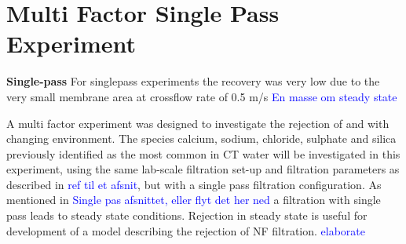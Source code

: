 \section{Multi Factor Single Pass Experiment}


\textbf{Single-pass}
For singlepass experiments the recovery was very low due to the very small membrane area at crossflow rate of 0.5 m/s
\textcolor{blue}{En masse om steady state}

A multi factor experiment was designed to investigate the rejection of  and  with changing environment.
The species calcium, sodium, chloride, sulphate and silica previously identified as the most common in CT water will be investigated in this experiment, using the same lab-scale filtration set-up and filtration parameters as described in \textcolor{blue}{ref til et afsnit}, but with a single pass filtration configuration.
As mentioned in \textcolor{blue}{Single pas afsnittet, eller flyt det her ned} a filtration with single pass leads to steady state conditions. 
Rejection in steady state is useful for development of a model describing the rejection of NF filtration. \textcolor{blue}{elaborate}

